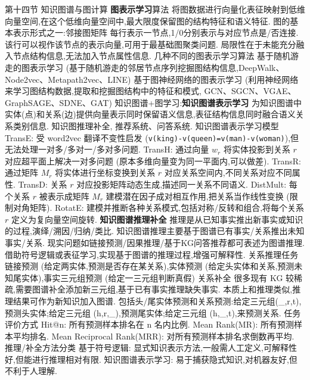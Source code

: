 \documentclass[10pt, utf8]{ctexart}
\begin{document}
\begin{multicols}{4}
    {\color{orange_}第十四节 知识图谱与图计算}
    {\color{purple_}\textbf{图表示学习}算法}
    将图数据进行向量化表征映射到低维向量空间,在这个低维向量空间中,最大限度保留图的结构特征和语义特征.
    {\color{blue}图的基本表示形式之一:邻接图矩阵}
    每行表示一节点,1/0分别表示与对应节点是/否连接.
    该行可以视作该节点的表示向量,可用于最基础图聚类问题.
    局限性在于未能充分融入节点结构信息,无法加入节点属性信息.
    {\color{blue}几种不同的图表示学习算法}
    基于随机游走的图表示学习 (基于随机游走的邻居节点序列挖掘图结构信息,DeepWalk、Node2vec、Metapath2vec、LINE)
    基于图神经网络的图表示学习 (利用神经网络来学习图结构数据,提取和挖掘图结构中的特征和模式, GCN、SGCN、VGAE、GraphSAGE、SDNE、GAT)
    {\color{purple_}知识图谱+图学习:\textbf{知识图谱表示学习}}
    为知识图谱中实体(点)和关系(边)提供向量表示同时保留语义信息,表征结构信息同时融合语义关系类别信息.
    知识图推理补全, 推荐系统、问答系统.
    {\color{blue}知识图谱表示学习模型}
    TransE\@: 受 word2vec 翻译不变性启发 (\verb|v(king)-v(queen)=v(man)-v(woman)|),但无法处理一对多/多对一/多对多问题.
    TransH\@: 通过向量 $w_r$ 将实体投影到关系 $r$ 对应超平面上解决一对多问题 (原本多维向量变为同一平面内,可以做差).
    TransR\@: 通过矩阵 $M_r$ 将实体进行坐标变换到关系 $r$ 对应关系空间内,不同关系对应不同属性.
    TransD\@: 关系 $r$ 对应投影矩阵动态生成,描述同一关系不同语义.
    DistMult\@: 每个关系 $r$ 被表示成矩阵 $M_r$ 建模潜在因子成对相互作用,把关系当作线性变换 (限制对角矩阵).
    RotatE\@: 建模并推断各种关系模式,包括对称/反转和组合,将每个关系 $r$ 定义为复向量空间旋转.
    {\color{purple_}\textbf{知识图谱推理补全}}
    推理是从已知事实推出新事实或知识的过程,演绎/溯因/归纳/类比.
    知识图谱推理主要基于图谱已有事实/关系推出未知事实/关系.
    现实问题如链接预测/因果推理/基于KG问答推荐都可表述为图谱推理.
    借助符号逻辑或表征学习,实现基于图谱的推理过程,增强可解释性.
    {\color{blue}关系推理任务}
    链接预测 (给定两实体,预测是否存在某关系),实体预测 (给定头实体和关系,预测未知尾实体),事实三元组预测 (给定一三元组判断真假)
    {\color{blue}关系补全}
    很多现有 KG 较稀疏,需要图谱补全添加新三元组,基于已有事实推理缺失事实.
    本质上和推理类似,推理结果可作为新知识加入图谱.
    包括头/尾实体预测和关系预测:给定三元组(\_,r,t),预测头实体;给定三元组 (h,r,\_),预测尾实体;给定三元组 (h,\_,t),来预测关系.
    {\color{blue}任务评价方式}
    Hit@n: 所有预测样本排名在 n 名内比例.
    Mean Rank(MR): 所有预测样本平均排名.
    Mean Reciprocal Rank(MRR): 对所有预测样本排名求倒数再平均.
    {\color{blue}推理/补全方法分类}
    基于符号逻辑: 显式知识表示方法,一般需人工定义,可解释性好,但能进行推理相对有限.
    知识图谱表示学习: 易于捕获隐式知识,对机器友好,但不利于人理解.

\end{multicols}
\end{document}
